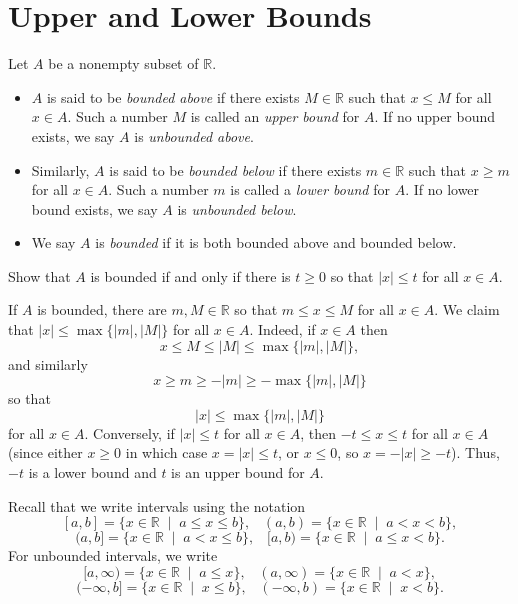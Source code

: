\documentclass[11pt,dvipsnames]{book}
\def\R{\mathbb{R}}
\numberwithin{figure}{section} %
\numberwithin{table}{section} %
\begin{document}
\section{Upper and Lower Bounds}%
\label{upperlowerbounds}

\def\LUB{{\rm LUB}}
\def\GLB{{\rm GLB}}
\def\ve{\varepsilon}
\def\limn{\lim_{n\rightarrow\infty}}

\def\R{\mathbb{R}}

\begin{definition}
Let $A$ be a nonempty subset of $\R$.
\begin{itemize}
\item $A$ is said to be {\it bounded above} if
there exists $M\in\R$ such that $x\leq M$ for all $x\in A$. Such a number $M$ is called an {\it upper bound} for $A$. If no upper bound exists, we say $A$ is {\it unbounded above}.

\item Similarly, $A$ is said to be {\it bounded below} if
there exists $m\in\R$ such that $x\geq m$ for all $x\in A$. Such a number $m$ is called a {\it lower bound} for $A$. If no lower bound exists, we say $A$ is {\it unbounded below}.

\item We say $A$ is {\it bounded} if it is both bounded above and bounded below.\\
\end{itemize}
\end{definition}

\begin{exercise}
\label{ex:bounded}
Show that $A$ is bounded if and only if there is $t\geq 0$ so that  $|x|\leq t$ for all $x\in A$.
\begin{solution}
If $A$ is bounded, there are $m,M\in\mathbb{R}$ so that $m\leq x\leq M$ for all $x\in A$. We claim that $|x|\leq \max\{|m|,|M|\}$ for all $x\in A$. Indeed, if $x\in A$ then
\[
x\leq M\leq  |M| \leq \max\{|m|,|M|\},
\]
and similarly
\[
x\geq m \geq - |m| \geq -\max\{|m|,|M|\}
\]
so that
\[|x|\leq \max\{|m|,|M|\}\]
for all $x\in A$.
Conversely, if $|x|\leq t$ for all $x\in A$, then $-t\leq x\leq t$ for all $x\in A$ (since either $x\geq 0$ in which case $x=|x|\leq t$, or $x\leq 0$, so $x=-|x|\geq -t$). Thus, $-t$ is a lower bound and $t$ is an upper bound for $A$.
\end{solution}
\end{exercise}

Recall that we write intervals using the notation
\[
[a,b]=\{x\in\mathbb{R} \;\; | \;\; a\leq x\leq b\}, \;\;\;
(a,b)=\{x\in\mathbb{R} \;\; | \;\; a< x< b\},
\]
\[
(a,b]=\{x\in\mathbb{R} \;\; | \;\; a< x\leq b\}, \;\;\;
[a,b)=\{x\in\mathbb{R} \;\; | \;\; a\leq  x< b\}.
\]
For unbounded intervals, we write
\[
[a,\infty)=\{x\in\mathbb{R} \;\; | \;\; a\leq x \}, \;\;\;
(a,\infty)=\{x\in\mathbb{R} \;\; | \;\; a< x \},
\]
\[
(-\infty,b]=\{x\in\mathbb{R} \;\; | \;\;  x\leq b\}, \;\;\;
(-\infty,b)=\{x\in\mathbb{R} \;\; | \;\; x< b\}.
\]
\end{document}
